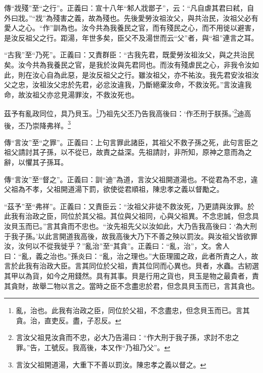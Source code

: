 {\noindent\zhuan{}\fzbyks 傳“戕殘”至“之行”。正義曰：宣十八年“邾人戕鄫子”，云：“凡自虐其君曰弒，自外曰戕。”“戕”為殘害之義，故為殘也。先後愛勞汝祖汝父，與共治民，汝祖父必有愛人之心。“作”訓為也。汝今共為我養民之官，而有殘民之心，而不用徙以避害，是汝反祖父之行。距湯，年世多矣，臣父不及湯世而云“父”者，與“祖”連言之耳。 \par}

{\noindent\shu{}\fzkt “古我”至“乃死”。正義曰：又責群臣：“古我先君，既愛勞汝祖汝父，與之共治民矣。汝今共為我養民之官，是我於汝與先君同也。而汝有殘虐民之心，非我令汝如此，則在汝心自為此惡，是汝反祖父之行。雖汝祖父，亦不祐汝。我先君安汝祖汝父之忠，汝祖汝父忠於先君，必忿汝違我，乃斷絕棄汝命，不救汝死。”言汝違我命，故汝祖父亦忿見湯罪汝，不救汝死也。 \par}

茲予有亂政同位，具乃貝玉。\footnote{亂，治也。此我有治政之臣，同位於父祖，不念盡忠，但念貝玉而已。言其貪。治，直吏反。盡，子忍反。}乃祖先父丕乃告我高後曰：‘作丕刑于朕孫。’\footnote{言汝父祖見汝貪而不忠，必大乃告湯曰：“作大刑于我子孫，求討不忠之罪。”告，工號反。我高後，本又作“乃祖乃父”。}迪高後，丕乃崇降弗祥。\footnote{言汝父祖開道湯，大重下不善以罰汝。陳忠孝之義以督之。}


{\noindent\zhuan{}\fzbyks 傳“言汝”至“之罪”。正義曰：上句言罪此諸臣，其祖父不救子孫之死，此句言臣之祖父請討其子孫，以不從已，故責之益深。先祖請討，非所知，原神之意而為之辭，以懼其子孫耳。 \par}

{\noindent\zhuan{}\fzbyks 傳“言汝”至“督之”。正義曰：訓“迪”為道，言汝父祖開道湯也。不從君為不忠，違父祖為不孝，父祖開道湯下罰，欲使從君順祖，陳忠孝之義以督勵之。 \par}

{\noindent\shu{}\fzkt “茲予”至“弗祥”。正義曰：又責臣云：“汝祖父非徒不救汝死，乃更請與汝罪。於此我有治政之臣，同位於其父祖。其位與父祖同，心與父祖異。不念忠誠，但念具汝貝玉而已。”言其貪而不忠也。“汝先祖先父以汝如此，大乃告我高後曰：‘為大刑于我子孫。’以此言開道我高後，故我高後大乃下不善之殃以罰汝。與汝祖父皆欲罪汝，汝何以不從我徙乎？”亂治”至“其貪”。正義曰：“亂，治”，文。舍人曰：“亂，義之治也。”孫炎曰：“亂，治之理也。”大臣理國之政，此者所責之人，故言於此我有治政大臣。言其同位於父祖，責其位同而心異也。貝者，水蟲。古紉選其甲以為貨，如今之用錢然。具有其事。貝是行用之貨也，貝玉是物之最貴者，責其貪財，故舉二物以言之。當時之臣不念盡忠於君，但念具貝玉而已，言其貪也。 \par}


